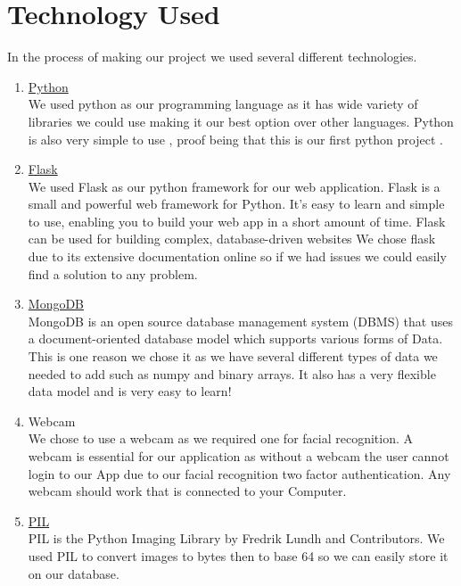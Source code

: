 \documentclass{article}
\begin{document}
\newpage

\section{Technology Used}
In the process of making our project we used several different technologies.
\begin{enumerate}
\item \href{https://www.python.org/downloads/}{Python} \\
We used python as our programming language as it has wide variety of libraries we could use making it our best option over other languages. Python is also very simple to use , proof being that this is our first python project .


\item \cite{flask}\href{https://flask.palletsprojects.com/en/1.1.x/}{Flask} \\
We used Flask as our python framework for our web application. 
Flask is a small and powerful web framework for Python. 
It's easy to learn and simple to use, enabling you to build your web app in a short amount of time. Flask can be used for building complex, database-driven websites
We chose flask due to its extensive documentation online so if we had issues we could easily find a solution to any problem.


\item \href{https://www.mongodb.com/}{MongoDB} \\
MongoDB is an open source database management system (DBMS) that uses a document-oriented database model which supports various forms of 
Data. This is one reason we chose it as we have several different types of data we needed to add such as numpy and binary arrays. It  also has  a very flexible data model and is very easy to learn!

\item Webcam \\	
We chose to use a webcam as we required one for facial recognition.
A webcam is essential for our application as without a webcam the user cannot login to our App due to our facial recognition two factor authentication. 
Any webcam should work that is connected to your Computer.

\item \cite{PIL}\href{https://pillow.readthedocs.io/en/stable/}{PIL} \\
PIL is the Python Imaging Library by Fredrik Lundh and Contributors.
We used PIL to convert images to bytes then to base 64 so we can easily store it on our database.


\end{enumerate}
\end{document}
